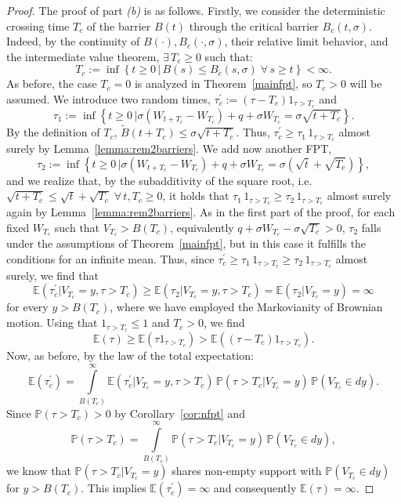 \documentclass[12pt]{article}
\theoremstyle{definition}
\begin{document}
\begin{proof}
The proof of part \textit{(b)} is as follows. Firstly, we consider the deterministic crossing time $T_c$ of the barrier $B(t)$ through the critical barrier $B_c(t,\sigma)$. Indeed, by the continuity of $B(\cdot),B_c(\cdot,\sigma)$, their relative limit behavior, and the intermediate value theorem, $\exists \, T_c \ge 0$ such that:
$$
T_c :=\inf \left\lbrace t\geq 0 \, \big\vert \, B(s) \le B_c(s,\sigma) \; \forall \, s \ge t \right\rbrace<\infty.
$$
As before, the case $T_c=0$ is analyzed in Theorem~\ref{mainfpt}, so $T_c>0$ will be assumed. We introduce two random times, $\tau^\prime_c:=(\tau-T_c)1_{\tau>T_c}$ and
$$
\tau_{1}:=\inf \left\lbrace t\geq 0 \, \big\vert \sigma(W_{t+T_c}-W_{T_c})+q+\sigma W_{T_c}=\sigma\sqrt{t+T_c}\right\rbrace.
$$
By the definition of $T_c$, $\tilde{B}(t+T_c)\leq \sigma\sqrt{t+T_c}$. Thus, $\tau^\prime_c \geq \tau_1 \, 1_{\tau>T_c}$ almost surely by Lemma~\ref{lemma:rem2barriers}. We add now another FPT,
$$
\tau_{2}:=\inf \left\lbrace t\geq 0 \, \big\vert \sigma(W_{t+T_c}-W_{T_c})+q+\sigma W_{T_c}=\sigma\left(\sqrt{t}+\sqrt{T_c}\right)\right\rbrace,
$$
and we realize that, by the subadditivity of the square root, i.e. $\sqrt{t+T_c}\leq \sqrt{t}+\sqrt{T_c}\;\forall \, t,T_c\geq 0$, it holds that $\tau_1 \, 1_{\tau>T_c} \geq \tau_2 \, 1_{\tau>T_c}$ almost surely again by Lemma~\ref{lemma:rem2barriers}. As in the first part of the proof, for each fixed $W_{T_c}$ such that $V_{T_c} > B(T_c)$, equivalently $q+\sigma W_{T_c}-\sigma\sqrt{T_c}>0$, $\tau_2$ falls under the assumptions of Theorem~\ref{mainfpt}, but in this case it fulfills the conditions for an infinite mean. Thus, since $\tau^\prime_c \geq \tau_1 \, 1_{\tau>T_c} \geq \tau_2 \, 1_{\tau>T_c}$ almost surely, we find that
$$
\mathbb{E}(\tau^\prime_c\vert V_{T_c}=y,\tau>T_c) \geq \mathbb{E}(\tau_2\vert V_{T_c}=y,\tau>T_c) = \mathbb{E}(\tau_2\vert V_{T_c}=y)= \infty
$$
for every $y>B(T_c)$, where we have employed the Markovianity of Brownian motion.
Using that $1_{\tau>T_c}\leq 1$ and $T_c > 0$, we find
\begin{equation}\nonumber
\mathbb{E}(\tau) \ge \mathbb{E}(\tau 1_{\tau>T_c}) > \mathbb{E}((\tau-T_c) 1_{\tau>T_c}).
\end{equation}
Now, as before, by the law of the total expectation:
\begin{equation}\nonumber
\mathbb{E}(\tau^\prime_c) = \int\limits_{B(T_c)}^\infty \mathbb{E}(\tau^\prime_c \vert V_{T_c}=y,\tau>T_c) \, \mathbb{P}(\tau>T_c\vert V_{T_c}=y) \, \mathbb{P}(V_{T_c} \in dy).
\end{equation}
Since $\mathbb{P}(\tau > T_c) >0$  by Corollary~\ref{cor:nfpt} and
$$
\mathbb{P}(\tau > T_c)=\int\limits_{B(T_c)}^\infty \mathbb{P}(\tau>T_c\vert V_{T_c}=y) \, \mathbb{P}(V_{T_c}\in dy),
$$
we know that $\mathbb{P}(\tau>T_c\vert V_{T_c}=y)$ shares non-empty support with $\mathbb{P}(V_{T_c}\in dy)$ for $y>B(T_c)$. This implies $\mathbb{E}(\tau^\prime_c)=\infty$ and consequently $\mathbb{E}(\tau)=\infty$.
\end{proof}
\end{document}

